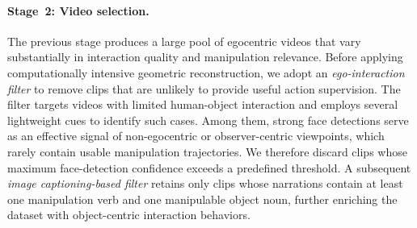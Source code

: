 \paragraph{Stage~2: Video selection.}
The previous stage produces a large pool of egocentric videos that vary substantially in interaction quality and manipulation relevance. Before applying computationally intensive geometric reconstruction, we adopt an
\emph{ego-interaction filter} to remove clips that are unlikely to provide useful action supervision. The filter targets videos with limited human-object interaction and employs several lightweight cues to identify such cases. Among them, strong face detections serve as an effective signal of non-egocentric or observer-centric viewpoints, which rarely contain usable manipulation trajectories. We therefore discard clips whose maximum face-detection confidence exceeds a predefined threshold. 
A subsequent \emph{image captioning-based filter} retains only clips whose narrations contain at least one manipulation verb and one manipulable object noun, further enriching the dataset with object-centric interaction behaviors.

